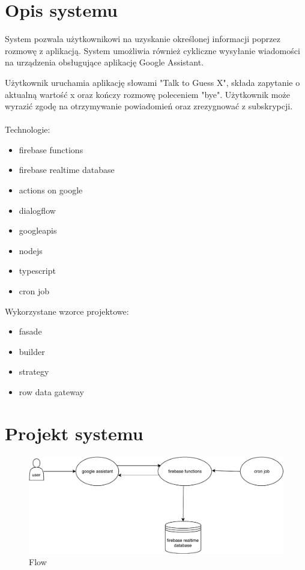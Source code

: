 \documentclass[a4paper,11pt]{article}
\begin{document}
	\newpage
	
	
	\section{Opis systemu}
	
	System pozwala użytkownikowi na uzyskanie określonej informacji poprzez rozmowę z aplikacją. System umożliwia również cykliczne wysyłanie wiadomości na urządzenia obsługujące aplikację Google Assistant.
	
	Użytkownik uruchamia aplikację słowami "Talk to Guess X", składa zapytanie o aktualną wartość x oraz kończy rozmowę poleceniem "bye". Użytkownik może wyrazić zgodę na otrzymywanie powiadomień oraz zrezygnować z subskrypcji.
	
	\paragraph{}
	Technologie:
	\begin{itemize}
		\item firebase functions
		\item firebase realtime database
		\item actions on google
		\item dialogflow
		\item googleapis
		\item nodejs 
		\item typescript
		\item cron job
	\end{itemize}

	Wykorzystane wzorce projektowe:
	\begin{itemize}
		\item fasade
		\item builder
		\item strategy
		\item row data gateway
	\end{itemize}


	\section{Projekt systemu}
	 
    	\begin{figure}[!h]
    		\begin{center}
    			\includegraphics[width=14cm]{guess-x-flow.pdf}
    		\end{center}
    		\caption[Caption for LOF]{Flow}
    		\label{flow}
    	\end{figure}
    
\end{document}
